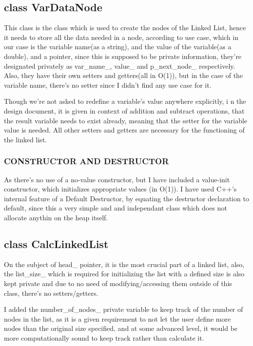     \subsection{{\color{orange}class} {\color{draculapurple}VarDataNode}}
    This class is the class which is used to create the nodes of the Linked List, 
    hence it needs to store all the data needed in a node, according to use case, 
    which in our case is the variable name{\color{orange}(as a string)}, and the value of the 
    variable{\color{orange}(as a double)}, and a pointer, since this is supposed to be private information, 
    they're designated privately as var\_name\_, value\_ and p\_next\_node\_ respectively. 
    Also, they have their own setters and getters{\color{lightblue}(all in O(1))}, 
    but in the case of the variable name, there's no setter since I didn't find 
    any use case for it. 
    
    Though we're not asked to redefine a variable's value anywhere explicitly, i
    n the design document, it is given in context of addition and subtract operations, 
    that the result variable needs to exist already, meaning that the setter 
    for the variable value is needed. All other setters and getters are 
    necessary for the functioning of the linked list. 
    \subsubsection{\color{draculapurple}CONSTRUCTOR AND DESTRUCTOR}
    As there's no use of a no-value constructor, but I have included a value-init constructor, 
    which initializes appropriate values {\color{lightblue}(in O(1))}.
    I have used C++'s internal feature of a Default Destructor, 
    by equating the destructor declaration to default, since this a very 
    simple and and independant class which does not allocate anythin on the heap itself. 
    \subsection{{\color{orange}class} {\color{draculapurple}CalcLinkedList}}
    On the subject of {\color{LimeGreen}head\_} pointer, it is the most crucial part of a linked list, 
    also, the {\color{LimeGreen}list\_size\_} which is required for initializing 
    the list with a defined size is also kept private and due to no 
    need of modifying/accessing them outside of this class, there's no setters/getters.

    I added the {\color{LimeGreen}number\_of\_nodes\_} private variable to keep 
    track of the number of nodes in the list, as it is a given requirement 
    to not let the user define more nodes than the original size specified, 
    and at some advanced level, it would be more computationally sound to keep 
    track rather than calculate it.

